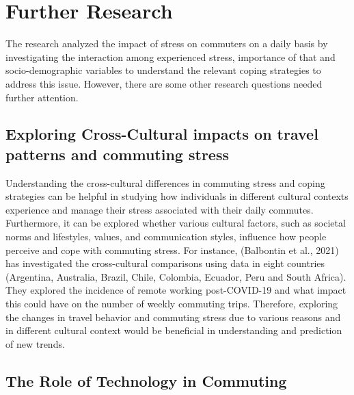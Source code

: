 \documentclass[
11pt, %
oneside, %
english, %
singlespacing, %
]{macthesis} %
\begin{document}
\hypertarget{further-research}{%
\section{Further Research}\label{further-research}}

The research analyzed the impact of stress on commuters on a daily basis by investigating the interaction among experienced stress, importance of that and socio-demographic variables to understand the relevant coping strategies to address this issue. However, there are some other research questions needed further attention.

\hypertarget{exploring-cross-cultural-impacts-on-travel-patterns-and-commuting-stress}{%
\subsection{Exploring Cross-Cultural impacts on travel patterns and commuting stress}\label{exploring-cross-cultural-impacts-on-travel-patterns-and-commuting-stress}}

Understanding the cross-cultural differences in commuting stress and coping strategies can be helpful in studying how individuals in different cultural contexts experience and manage their stress associated with their daily commutes. Furthermore, it can be explored whether various cultural factors, such as societal norms and lifestyles, values, and communication styles, influence how people perceive and cope with commuting stress. For instance, (Balbontin et al., 2021) has investigated the cross-cultural comparisons using data in eight countries (Argentina, Australia, Brazil, Chile, Colombia, Ecuador, Peru and South Africa). They explored the incidence of remote working post-COVID-19 and what impact this could have on the number of weekly commuting trips. Therefore, exploring the changes in travel behavior and commuting stress due to various reasons and in different cultural context would be beneficial in understanding and prediction of new trends.

\hypertarget{the-role-of-technology-in-commuting}{%
\subsection{The Role of Technology in Commuting}\label{the-role-of-technology-in-commuting}}
\end{document}

